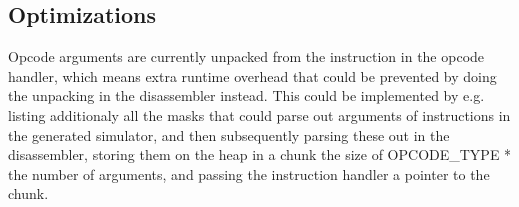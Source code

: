 \subsection{Optimizations}
Opcode arguments are currently unpacked from the instruction in the opcode
handler, which means extra runtime overhead that could be prevented by doing
the unpacking in the disassembler instead. This could be implemented by e.g.
listing additionaly all the masks that could parse out arguments of
instructions in the generated simulator, and then subsequently parsing these
out in the disassembler, storing them on the heap in a chunk the size of 
OPCODE\_TYPE * the number of arguments, and passing the instruction handler a 
pointer to the chunk.
